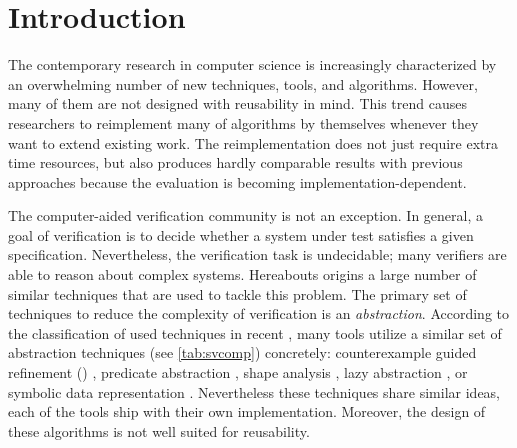 \chapter{Introduction}
\label{ch:intro}


The contemporary research in computer science is increasingly characterized by
an overwhelming number of new techniques, tools, and algorithms.  However, many
of them are not designed with reusability in mind.  This trend causes
researchers to reimplement many of algorithms by themselves whenever they want
to extend existing work.  The reimplementation does not just require extra time
resources, but also produces hardly comparable results with previous approaches
because the evaluation is becoming implementation-dependent.

The computer-aided verification community is not an exception. In general, a
goal of verification is to decide whether a system under test satisfies a given
specification. Nevertheless, the verification task is undecidable; many
verifiers are able to reason about complex systems. Hereabouts origins a large
number of similar techniques that are used to tackle this problem. The primary
set of techniques to reduce the complexity of verification is an
\emph{abstraction}. According to the classification of used techniques in
recent \svcomp \cite{SVCOMP2019}, many tools utilize a similar set of
abstraction techniques (see \autoref{tab:svcomp}) concretely: counterexample
guided refinement (\cegar) \cite{Clarke20}, predicate abstraction
\cite{Flanagan02}, shape analysis \cite{Yang2008}, lazy abstraction
\cite{Henzinger2002}, or symbolic data representation
\cite{King76,Burch1990,Majumdar2018}. Nevertheless these techniques share
similar ideas, each of the tools ship with their own implementation.  Moreover,
the design of these algorithms is not well suited for reusability.

